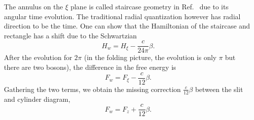 The annulus on the $\xi$ plane is called staircase geometry in Ref.~ due to its angular time evolution. The traditional radial quantization however has radial direction to be the time. One can show that the Hamiltonian of the staircase and rectangle has a shift due to the Schwartzian\cite{cardy_finite-size_1988}
\begin{equation}
H_{w} = H_{\xi} - \frac{c}{24\pi} \beta .
\end{equation}
After the evolution for $2\pi$ (in the folding picture, the evolution is only $\pi$ but there are two bosons), the difference in the free energy is
\begin{equation}
F_w = F_{\xi} - \frac{c}{12} \beta .
\end{equation}
Gathering the two terms, we obtain the missing correction $\frac{c}{12} \beta$ between the slit and cylinder diagram, 
\begin{equation}
F_{w} = F_z + \frac{c}{12}\beta.
\end{equation}


